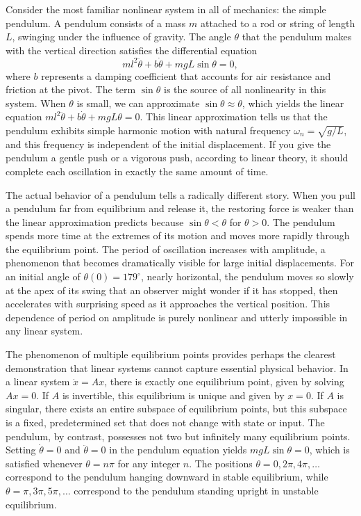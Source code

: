 Consider the most familiar nonlinear system in all of mechanics: the simple pendulum. A pendulum consists of a mass $m$ attached to a rod or string of length $L$, swinging under the influence of gravity. The angle $\theta$ that the pendulum makes with the vertical direction satisfies the differential equation
\begin{equation}
ml^2\ddot{\theta} + b\dot{\theta} + mgL\sin\theta = 0,
\end{equation}
where $b$ represents a damping coefficient that accounts for air resistance and friction at the pivot. The term $\sin\theta$ is the source of all nonlinearity in this system. When $\theta$ is small, we can approximate $\sin\theta \approx \theta$, which yields the linear equation $ml^2\ddot{\theta} + b\dot{\theta} + mgL\theta = 0$. This linear approximation tells us that the pendulum exhibits simple harmonic motion with natural frequency $\omega_n = \sqrt{g/L}$, and this frequency is independent of the initial displacement. If you give the pendulum a gentle push or a vigorous push, according to linear theory, it should complete each oscillation in exactly the same amount of time.

The actual behavior of a pendulum tells a radically different story. When you pull a pendulum far from equilibrium and release it, the restoring force is weaker than the linear approximation predicts because $\sin\theta < \theta$ for $\theta > 0$. The pendulum spends more time at the extremes of its motion and moves more rapidly through the equilibrium point. The period of oscillation increases with amplitude, a phenomenon that becomes dramatically visible for large initial displacements. For an initial angle of $\theta(0) = 179^\circ$, nearly horizontal, the pendulum moves so slowly at the apex of its swing that an observer might wonder if it has stopped, then accelerates with surprising speed as it approaches the vertical position. This dependence of period on amplitude is purely nonlinear and utterly impossible in any linear system.

The phenomenon of multiple equilibrium points provides perhaps the clearest demonstration that linear systems cannot capture essential physical behavior. In a linear system $\dot{x} = Ax$, there is exactly one equilibrium point, given by solving $Ax = 0$. If $A$ is invertible, this equilibrium is unique and given by $x = 0$. If $A$ is singular, there exists an entire subspace of equilibrium points, but this subspace is a fixed, predetermined set that does not change with state or input. The pendulum, by contrast, possesses not two but infinitely many equilibrium points. Setting $\dot{\theta} = 0$ and $\ddot{\theta} = 0$ in the pendulum equation yields $mgL\sin\theta = 0$, which is satisfied whenever $\theta = n\pi$ for any integer $n$. The positions $\theta = 0, 2\pi, 4\pi, \ldots$ correspond to the pendulum hanging downward in stable equilibrium, while $\theta = \pi, 3\pi, 5\pi, \ldots$ correspond to the pendulum standing upright in unstable equilibrium.

